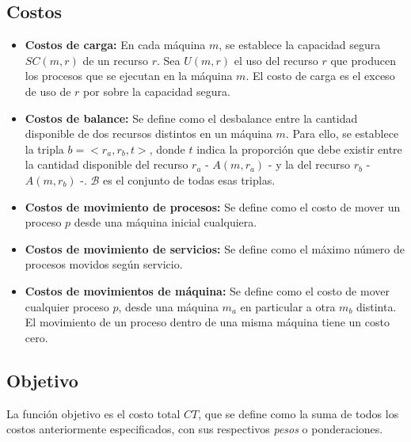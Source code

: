 \subsection{Costos}
\begin{itemize}
	\item \textbf{Costos de carga:} En cada máquina $m$, se establece la capacidad segura $SC(m,r)$ de un recurso $r$. Sea $U(m,r)$ el uso del recurso $r$ que producen los procesos que se ejecutan en la máquina $m$. El costo de carga es el exceso de uso de $r$ por sobre la capacidad segura. 

	\item \textbf{Costos de balance:} Se define como el desbalance entre la cantidad disponible de dos recursos distintos en un máquina $m$. Para ello, se establece la tripla $b = <r_a,r_b,t>$, donde $t$ indica la proporción que debe existir entre la cantidad disponible del recurso $r_a$ - $A(m,r_a)$ - y la del recurso $r_b$ - $A(m,r_b)$ -. $\mathcal{B}$ es el conjunto de todas esas triplas. 

	\item \textbf{Costos de movimiento de procesos:} Se define como el costo de mover un proceso $p$ desde una máquina inicial cualquiera.

	\item \textbf{Costos de movimiento de servicios:} Se define como el máximo número de procesos movidos según servicio.

	\item \textbf{Costos de movimientos de máquina:} Se define como el costo de mover cualquier proceso $p$, desde una máquina $m_a$ en particular a otra $m_b$ distinta. El movimiento de un proceso dentro de una misma máquina tiene un costo cero. 

\end{itemize}

\subsection{Objetivo}
La función objetivo es el costo total $CT$, que se define como la suma de todos los costos anteriormente especificados, con sus respectivos \textit{pesos} o ponderaciones. \\

